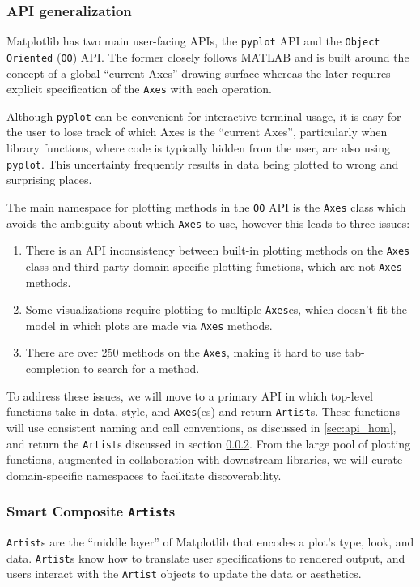 \documentclass[12pt,letterpaper]{article}  %
\begin{document}
\subsubsection{API generalization}
\label{sec:api_gen}
Matplotlib has two main user-facing APIs, the \texttt{pyplot} API and
the \texttt{Object Oriented} (\texttt{OO}) API.  The former closely
follows MATLAB and is built around the concept of a global ``current
Axes'' drawing surface whereas the later requires explicit specification
of the \texttt{Axes} with each operation.

Although \texttt{pyplot} can be convenient for interactive terminal
usage, it is easy for the user to lose track of which Axes is the
``current Axes'', particularly when library functions, where code is
typically hidden from the user, are also using \texttt{pyplot}.  This
uncertainty frequently results in data being plotted to wrong and
surprising places.


The main namespace for plotting methods in the \texttt{OO} API is
the \texttt{Axes} class which avoids the ambiguity about which
\texttt{Axes} to use, however this
leads to three issues:
\begin{enumerate}
\item There is an API inconsistency between built-in plotting methods
  on the \texttt{Axes} class and third party domain-specific plotting
  functions, which are not \texttt{Axes} methods.
\item Some visualizations require plotting to multiple
  \texttt{Axes}es, which doesn't fit the model in which plots are made
  via \texttt{Axes} methods.
\item There are over 250 methods on the \texttt{Axes}, making it hard
  to use tab-completion to search for a method.
\end{enumerate}

To address these issues, we will move to a primary API in which
top-level functions take in data, style, and \texttt{Axes}(es) and
return \texttt{Artist}s.  These functions will use consistent naming
and call conventions, as discussed in \ref{sec:api_hom}, and return the
\texttt{Artist}s discussed in section \ref{sec:artists}. From the
large pool of plotting functions, augmented in collaboration with
downstream libraries, we will curate domain-specific namespaces to
facilitate discoverability.


\subsubsection{Smart Composite \texttt{Artist}s}
\label{sec:artists}
\texttt{Artist}s are the ``middle layer'' of Matplotlib that encodes a
plot's type, look, and data.  \texttt{Artist}s know how to translate
user specifications to rendered output, and users interact with the
\texttt{Artist} objects to update the data or aesthetics.
\end{document}
